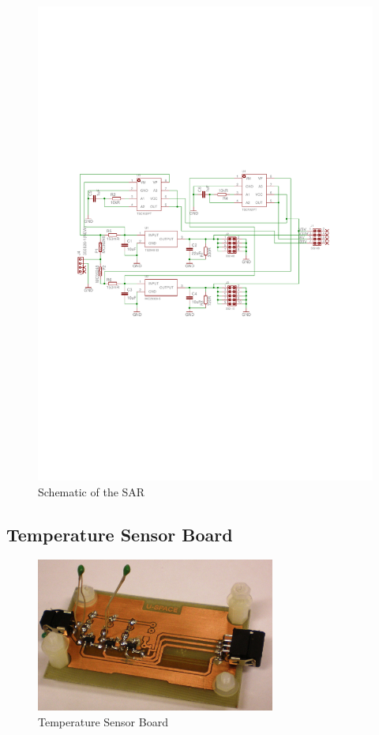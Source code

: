\begin{figure}[H]
\centering
\includegraphics[width=\textwidth]{figures/fig_Schematic_SAR}
\caption{Schematic of the \acl{SAR}}
\label{fig:SAR_Schematic}
\end{figure}


\subsection{Temperature Sensor Board}


\begin{figure}[H]
\centering
\includegraphics[width=0.7\textwidth]{figures/fig_Temp_top}
\caption{Temperature Sensor Board}
\label{fig:TS_top}
\end{figure}

